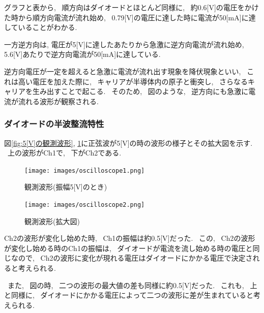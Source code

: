 \documentclass[uplatex,dvipdfmx,a4paper,js=standard, titlepage]{bxjsarticle}
\begin{document}
            グラフと表から, ~順方向はダイオードとほとんど同様に, ~約0.6[V]の電圧をかけた時から順方向電流が流れ始め,
            ~0.79[V]の電圧に達した時に電流が50[mA]に達していることがわかる.

            一方逆方向は, 電圧が5[V]に達したあたりから急激に逆方向電流が流れ始め, 5.6[V]あたりで逆方向電流が50[mA]に達している.

            逆方向電圧が一定を超えると急激に電流が流れ出す現象を降伏現象といい, ~これは高い電圧を加えた際に,
            ~キャリアが半導体内の原子と衝突し, ~さらなるキャリアを生み出すことで起こる.
            ~そのため, ~図のような, ~逆方向にも急激に電流が流れる波形が観察される.

        \subsubsection{ダイオードの半波整流特性}
            図\ref{fig:5[V]の観測波形}, \ref{fig:観測波形の拡大図}に正弦波が5[V]の時の波形の様子とその拡大図を示す.
            ~上の波形がCh1で, ~下がCh2である.
            \begin{figure}[ht]
                \begin{minipage}{0.5\hsize}
                    \begin{center}
                        \texttt{[image: images/oscilloscope1.png]}
                        \caption{観測波形(振幅5[V]のとき)}
                        \label{fig:5[V]の観測波形}
                    \end{center}
                \end{minipage}
                \begin{minipage}{0.5\hsize}
                    \begin{center}
                        \texttt{[image: images/oscilloscope2.png]}
                        \caption{観測波形(拡大図)}
                        \label{fig:観測波形の拡大図}
                    \end{center}
                \end{minipage}
            \end{figure}

            Ch2の波形が変化し始めた時, ~Ch1の振幅は約0.5[V]だった.
            ~この, ~Ch2の波形が変化し始める時のCh1の振幅は,
            ~ダイオードが電流を流し始める時の電圧と同じなので,
            ~Ch2の波形に変化が現れる電圧はダイオードにかかる電圧で決定されると考えられる.

            ~また, ~図の時, ~二つの波形の最大値の差も同様に約0.5[V]だった.
            ~これも, ~上と同様に, ~ダイオードにかかる電圧によって二つの波形に差が生まれていると考えられる.
\end{document}
